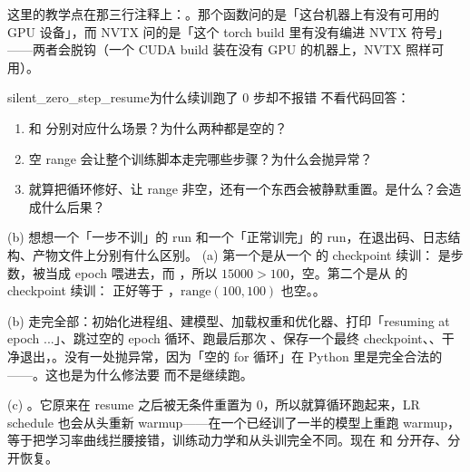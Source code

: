 这里的教学点在那三行注释上：。那个函数问的是「这台机器上有没有可用的 GPU 设备」，而 NVTX 问的是「这个 torch build 里有没有编进 NVTX 符号」——两者会脱钩（一个 CUDA build 装在没有 GPU 的机器上，NVTX 照样可用）。

\begin{checkpoint}{silent_zero_step_resume}{为什么续训跑了 0 步却不报错}
不看代码回答：
\begin{enumerate}[label=(\alph*)]
  \item {} 和  分别对应什么场景？为什么两种都是空的？
  \item 空 range 会让整个训练脚本走完哪些步骤？为什么会抛异常？
  \item 就算把循环修好、让 range 非空，还有一个东西会被静默重置。是什么？会造成什么后果？
\end{enumerate}
\hint (b) 想想一个「一步不训」的 run 和一个「正常训完」的 run，在退出码、日志结构、产物文件上分别有什么区别。
\ifshowanswers
\tcblower
\answer (a) 第一个是从一个  的 checkpoint 续训： 是步数，被当成 epoch 喂进去，而 ，所以 $15000 > 100$，空。第二个是从  的 checkpoint 续训： 正好等于 ，$\mbox{range}(100,100)$ 也空。。

(b) 走完全部：初始化进程组、建模型、加载权重和优化器、打印「resuming at epoch ...」、跳过空的 epoch 循环、跑最后那次 、保存一个最终 checkpoint、、干净退出，。没有一处抛异常，因为「空的 for 循环」在 Python 里是完全合法的——。这也是为什么修法要 而不是继续跑。

(c) 。它原来在 resume 之后被无条件重置为 0，所以就算循环跑起来，LR schedule 也会从头重新 warmup——在一个已经训了一半的模型上重跑 warmup，等于把学习率曲线拦腰接错，训练动力学和从头训完全不同。现在  和  分开存、分开恢复。
\whereincode {}
\fi
\end{checkpoint}

